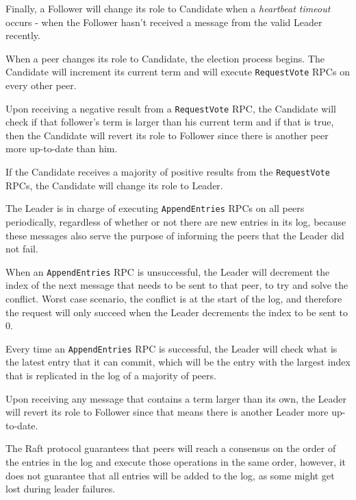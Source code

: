 Finally, a Follower will change its role to Candidate when a \textit{heartbeat timeout} occurs - when the Follower hasn’t received a message from the valid Leader recently.

\vspace{0.5cm}

When a peer changes its role to Candidate, the election process begins. The Candidate will increment its current term and will execute \texttt{RequestVote} RPCs on every other peer.

Upon receiving a negative result from a \texttt{RequestVote} RPC, the Candidate will check if that follower’s term is larger than his current term and if that is true, then the Candidate will revert its role to Follower since there is another peer more up-to-date than him.

If the Candidate receives a majority of positive results from the \texttt{RequestVote} RPCs, the Candidate will change its role to Leader.

\vspace{0.5cm}

The Leader is in charge of executing \texttt{AppendEntries} RPCs on all peers periodically, regardless of whether or not there are new entries in its log, because these messages also serve the purpose of informing the peers that the Leader did not fail.

When an \texttt{AppendEntries} RPC is unsuccessful, the Leader will decrement the index of the next message that needs to be sent to that peer, to try and solve the conflict. Worst case scenario, the conflict is at the start of the log, and therefore the request will only succeed when the Leader decrements the index to be sent to 0.

Every time an \texttt{AppendEntries} RPC is successful, the Leader will check what is the latest entry that it can commit, which will be the entry with the largest index that is replicated in the log of a majority of peers.

Upon receiving any message that contains a term larger than its own, the Leader will revert its role to Follower since that means there is another Leader more up-to-date.

\vspace{0.5cm}

The Raft protocol guarantees that peers will reach a consensus on the order of the entries in the log and execute those operations in the same order, however, it does not guarantee that all entries will be added to the log, as some might get lost during leader failures.



